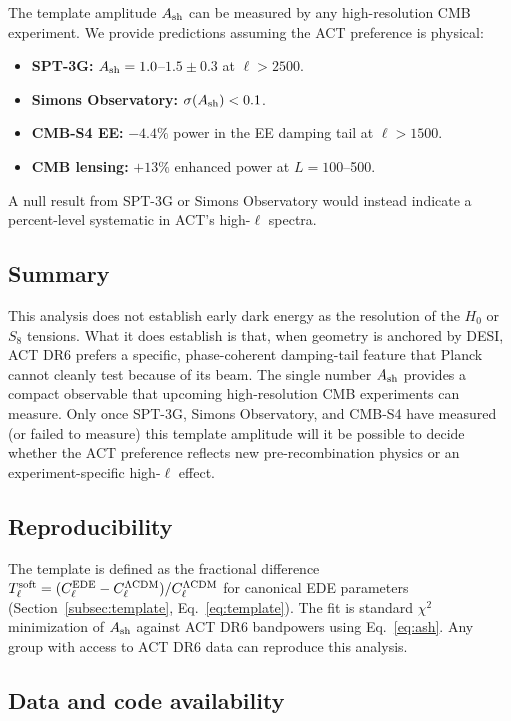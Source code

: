 \documentclass[twocolumn,showpacs,preprintnumbers,amsmath,amssymb,prd]{revtex4-2}
\begin{document}
The template amplitude $A_{\rm sh}$ can be measured by any high-resolution 
CMB experiment. We provide predictions assuming the ACT preference is physical:
\begin{itemize}
\item \textbf{SPT-3G:} $A_{\rm sh} = 1.0$--$1.5 \pm 0.3$ at $\ell > 2500$.
\item \textbf{Simons Observatory:} $\sigma(A_{\rm sh}) < 0.1$.
\item \textbf{CMB-S4 EE:} $-4.4\%$ power in the EE damping tail at $\ell > 1500$.
\item \textbf{CMB lensing:} $+13\%$ enhanced power at $L = 100$--500.
\end{itemize}

A null result from SPT-3G or Simons Observatory would instead indicate 
a percent-level systematic in ACT's high-$\ell$ spectra.

\subsection{Summary}

This analysis does not establish early dark energy as the resolution of the 
$H_0$ or $S_8$ tensions. What it does establish is that, when geometry is 
anchored by DESI, ACT DR6 prefers a specific, phase-coherent damping-tail 
feature that Planck cannot cleanly test because of its beam. The single 
number $A_{\rm sh}$ provides a compact observable that upcoming high-resolution 
CMB experiments can measure. Only once SPT-3G, Simons Observatory, and CMB-S4 
have measured (or failed to measure) this template amplitude will it be 
possible to decide whether the ACT preference reflects new pre-recombination 
physics or an experiment-specific high-$\ell$ effect.

\subsection{Reproducibility}

The template is defined as the fractional difference 
$T_\ell^{\rm soft} = (C_\ell^{\rm EDE} - C_\ell^{\rm \Lambda CDM})/C_\ell^{\rm \Lambda CDM}$ 
for canonical EDE parameters (Section~\ref{subsec:template}, Eq.~\ref{eq:template}). 
The fit is standard $\chi^2$ minimization of $A_{\rm sh}$ against ACT DR6 bandpowers 
using Eq.~\ref{eq:ash}. Any group with access to ACT DR6 data can reproduce 
this analysis.

\subsection{Data and code availability}
\end{document}
